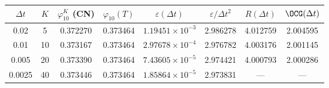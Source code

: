 \begin{tabular}{cccccccc}\toprule
$\Delta t$ & $K$ & $\varphi_{10}^{K}$ (CN) & $\varphi_{10}(T)$ & $\varepsilon(\Delta t)$ & $\varepsilon/\Delta t^2$ & $R(\Delta t)$ & $\OCG(\Delta t)$\\\midrule
0.02 & 5 & 0.372270 & 0.373464 & $1.19451\times10^{-3}$ & 2.986278 & 4.012759 & 2.004595\\
0.01 & 10 & 0.373167 & 0.373464 & $2.97678\times10^{-4}$ & 2.976782 & 4.003176 & 2.001145\\
0.005 & 20 & 0.373390 & 0.373464 & $7.43605\times10^{-5}$ & 2.974421 & 4.000793 & 2.000286\\
0.0025 & 40 & 0.373446 & 0.373464 & $1.85864\times10^{-5}$ & 2.973831 & --- & ---\\
\bottomrule
\end{tabular}

